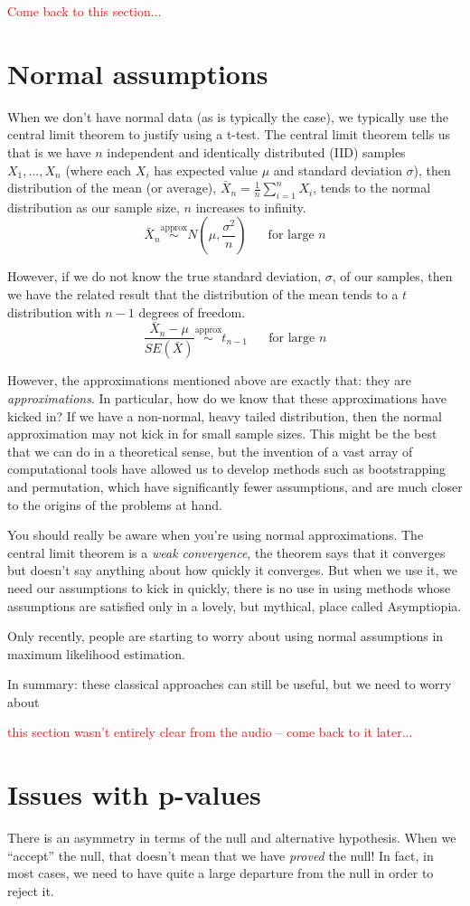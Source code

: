 \textcolor{red}{Come back to this section...}


\section{Normal assumptions}

When we don't have normal data (as is typically the case), we typically use the central limit theorem to justify using a t-test. The central limit theorem tells us that is we have $n$ independent and identically distributed (IID) samples $X_1, ..., X_n$ (where each $X_i$ has expected value $\mu$ and standard deviation $\sigma$), then distribution of the mean (or average), $\bar{X}_n = \frac{1}{n} \sum_{i=1}^n X_i$, tends to the normal distribution as our sample size, $n$ increases to infinity. $$\bar{X}_n  \overset{\text{approx}}{\sim} N\left(\mu, \frac{\sigma^2}{n}\right) ~~~~~~ \text{ for large $n$}$$

However, if we do not know the true standard deviation, $\sigma$, of our samples, then we have the related result that the distribution of the mean tends to a $t$ distribution with $n-1$ degrees of freedom. $$\frac{\bar{X}_n - \mu}{SE(\bar{X})} \overset{\text{approx}}{\sim} t_{n-1} ~~~~~~ \text{ for large $n$}$$


However, the approximations mentioned above are exactly that: they are \emph{approximations}. In particular, how do we know that these approximations have kicked in? If we have a non-normal, heavy tailed distribution, then the normal approximation may not kick in for small sample sizes. This might be the best that we can do in a theoretical sense, but the invention of a vast array of computational tools have allowed us to develop methods such as bootstrapping and
permutation, which have significantly fewer assumptions, and are much closer to the origins of the problems at hand.


You should really be aware when you're using normal approximations. The central limit theorem is a \emph{weak convergence}, the theorem says that it converges but doesn't say anything about how quickly it converges. But when we use it, we need our assumptions to kick in quickly, there is no use in using methods whose assumptions are satisfied only in a lovely, but mythical, place called Asymptiopia.

Only recently, people are starting to worry about using normal assumptions in maximum likelihood estimation.

In summary: these classical approaches can still be useful, but we need to worry about

\textcolor{red}{this section wasn't entirely clear from the audio -- come back
to it later...}


\section{Issues with p-values}

There is an asymmetry in terms of the null and alternative hypothesis. When we ``accept'' the null, that doesn't mean that we have \emph{proved} the null! In fact, in most cases, we need to have quite a large departure from the null in order to reject it.
